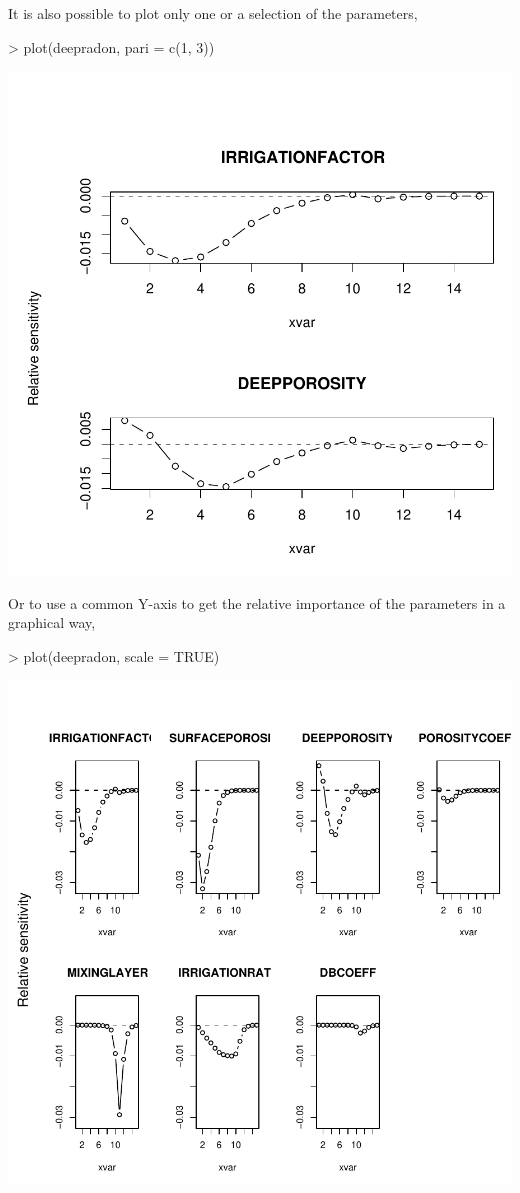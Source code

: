 \documentclass{scrartcl}
\begin{document}
It is also possible to plot only one or a selection of the parameters,

\begin{Schunk}
\begin{Sinput}
> plot(deepradon, pari = c(1, 3))
\end{Sinput}
\end{Schunk}
\includegraphics{figures/f-023}

Or to use a common Y-axis to get the relative importance of the
parameters in a graphical way,

\begin{Schunk}
\begin{Sinput}
> plot(deepradon, scale = TRUE)
\end{Sinput}
\end{Schunk}
\includegraphics{figures/f-024}
\end{document}
